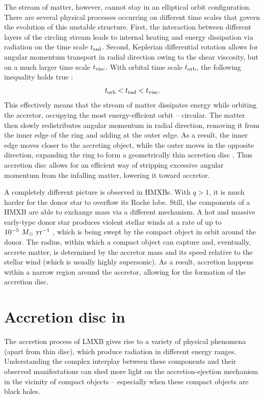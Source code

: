 The stream of matter, however, cannot stay in an elliptical orbit configuration.
There are several physical processes occurring on different time scales that govern the evolution of this unstable structure.
First, the interaction between different layers of the circling stream leads to internal heating and energy dissipation via radiation on the time scale $t_{\mathrm{rad}}$.
Second, Keplerian differential rotation allows for angular momentum transport in radial direction owing to the shear viscosity, but on a much larger time scale $t_{\mathrm{visc}}$.
With orbital time scale $t_{\mathrm{orb}}$, the following inequality holds true \citep{AccretionPower}:
\begin{equation}
    t_{\mathrm{orb}} < t_{\mathrm{rad}} < t_{\mathrm{visc}}.
\end{equation}
This effectively means that the stream of matter dissipates energy while orbiting the accretor, occupying the most energy-efficient orbit -- circular.
The matter then slowly redistributes angular momentum in radial direction, removing it from the inner edge of the ring and adding at the outer edge.
As a result, the inner edge moves closer to the accreting object, while the outer moves in the opposite direction, expanding the ring to form a geometrically thin accretion disc \citep{Shakura1973, Novikov1973}.
Thus accretion disc allows for an efficient way of stripping excessive angular momentum from the infalling matter, lowering it toward accretor.


A completely different picture is observed in \glspl{HMXB}.
With $q > 1$, it is much harder for the donor star to overflow its Roche lobe.
Still, the components of a \gls{HMXB} are able to exchange mass via a different mechanism.
A hot and massive early-type donor star produces violent stellar winds at a rate of up to $10^{-5}~M_\odot~\mathrm{yr}^{-1}$ \citep{AccretionPower}, which is being swept by the compact object in orbit around the donor.
The radius, within which a compact object can capture and, eventually, accrete matter, is determined by the accretor mass and its speed relative to the stellar wind (which is usually highly supersonic).
As a result, accretion happens within a narrow region around the accretor, allowing for the formation of the accretion disc.


\section{Accretion disc in }
The accretion process of \gls{LMXB} gives rise to a variety of physical phenomena (apart from thin disc), which produce radiation in different energy ranges.
Understanding the complex interplay between these components and their observed manifestations can shed more light on the accretion-ejection mechanism in the vicinity of compact objects -- especially when these compact objects are black holes.

